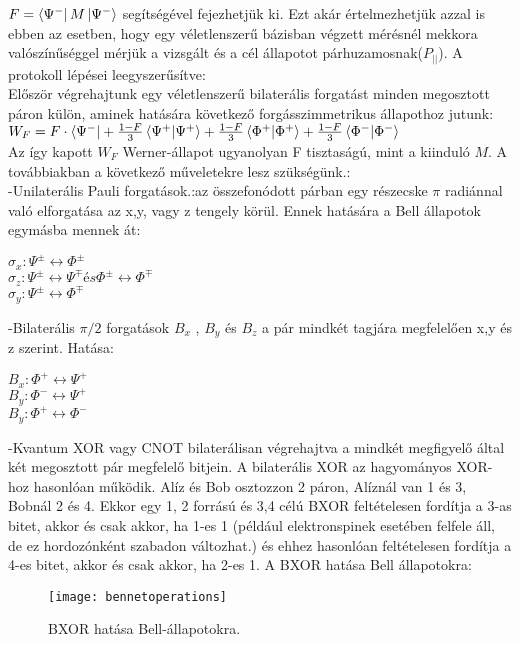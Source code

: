 $ F= \bra{\Psi^-}M\ket{\Psi^-} $ 
segítségével fejezhetjük ki. Ezt akár értelmezhetjük azzal is ebben az esetben, hogy egy véletlenszerű bázisban végzett mérésnél mekkora valószínűséggel mérjük a vizsgált és a cél állapotot párhuzamosnak($P_{||}$).
A protokoll lépései leegyszerűsítve:\\
Először végrehajtunk egy véletlenszerű bilaterális forgatást minden megosztott páron külön, aminek hatására következő forgásszimmetrikus állapothoz jutunk:\\
$ W_F = F \cdot \bra{\Psi^-} + \frac{1-F}{3}\bra{\Psi^+}\ket{\Psi^+} + \frac{1-F}{3}\bra{\Phi^+}\ket{\Phi^+} + \frac{1-F}{3}\bra{\Phi^-}\ket{\Phi^-} $
\\
Az így kapott $W_F$  Werner-állapot ugyanolyan F tisztaságú, mint a kiinduló $M$. A továbbiakban a következő műveletekre lesz szükségünk.:\\
-Unilaterális Pauli forgatások.:az összefonódott párban egy részecske  $\pi$ radiánnal való elforgatása az x,y, vagy z tengely körül. Ennek hatására a Bell állapotok egymásba mennek át: \\
\begin{center}
$\sigma_x : \Psi^\pm \leftrightarrow \Phi^\pm $\\
$\sigma_z : \Psi^\pm \leftrightarrow \Psi^\mp és \Phi^\pm \leftrightarrow \Phi^\mp $ \\
$\sigma_y : \Psi^\pm \leftrightarrow \Phi^\mp $
\end{center}
-Bilaterális $\pi/2$ forgatások $B_x$ , $B_y$ és $B_z$ a pár mindkét tagjára megfelelően x,y és z szerint. Hatása:\\
\begin{center}
$B_x : \Phi^+ \leftrightarrow \Psi^+$ \\
$B_y : \Phi^- \leftrightarrow \Psi^+$ \\
$B_y : \Phi^+ \leftrightarrow \Phi^-$
\end{center}
-Kvantum XOR vagy CNOT bilaterálisan végrehajtva a mindkét megfigyelő által két megosztott pár megfelelő bitjein. A bilaterális XOR az hagyományos XOR-hoz hasonlóan működik. Alíz és Bob osztozzon 2 páron, Alíznál van 1 és 3, Bobnál 2 és 4. Ekkor egy 1, 2  forrású és 3,4 célú BXOR feltételesen fordítja a 3-as bitet, akkor és csak akkor, ha 1-es 1 (például elektronspinek esetében felfele áll, de ez hordozónként szabadon változhat.) és ehhez hasonlóan feltételesen fordítja a 4-es bitet, akkor és csak akkor, ha 2-es 1. A BXOR hatása Bell állapotokra:\\
\begin{figure}[H]
\centering
\texttt{[image: bennetoperations]}
\caption[BXOR hatása Bell állapotokra]{BXOR hatása Bell-állapotokra.}
\end{figure}
